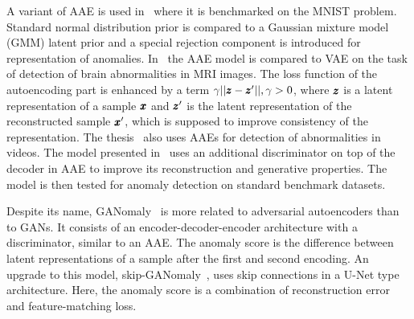 A variant of AAE is used in~\cite{leveau2017adversarial} where it is benchmarked on the MNIST problem. Standard normal distribution prior is compared to a Gaussian mixture model (GMM) latent prior and a special rejection component is introduced for representation of anomalies. In~\cite{chen2018unsupervised} the AAE model is compared to VAE on the task of detection of brain abnormalities in MRI images. The loss function of the autoencoding part is enhanced by a term $\gamma||\pmb{{z}}-\pmb{{z}}'||, \gamma > 0$, where $\pmb{{z}}$ is a latent representation of a sample $\pmb{{x}}$ and $\pmb{{z}}'$ is the latent representation of the reconstructed sample $\pmb{{x}}'$, which is supposed to improve consistency of the representation. The thesis~\cite{dimokranitou2017adversarial} also uses AAEs for detection of abnormalities in videos. The model presented in~\cite{pidhorskyi2018generative} uses an additional discriminator on top of the decoder in AAE to improve its reconstruction and generative properties. The model is then tested for anomaly detection on standard benchmark datasets.

Despite its name, GANomaly~\cite{akcay2018ganomaly, ahnDeepGenerativeModelsBased2020} is more related to adversarial autoencoders than to GANs. It consists of an encoder-decoder-encoder architecture with a discriminator, similar to an AAE. The anomaly score is the difference between latent representations of a sample after the first and second encoding. An upgrade to this model, skip-GANomaly~\cite{akcay2019skip}, uses skip connections in a U-Net type architecture. Here, the anomaly score is a combination of reconstruction error and feature-matching loss.

